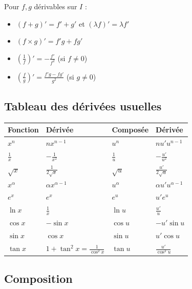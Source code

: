 \begin{propbox}
Pour $f, g$ dérivables sur $I$ :
\begin{itemize}[leftmargin=1cm]
  \item $(f + g)' = f' + g'$ \quad et \quad $(\lambda f)' = \lambda f'$
  \item $(f \times g)' = f'g + fg'$
  \item $\displaystyle\left(\frac{1}{f}\right)' = -\frac{f'}{f^2}$ \quad (si $f \neq 0$)
  \item $\displaystyle\left(\frac{f}{g}\right)' = \frac{f'g - fg'}{g^2}$ \quad (si $g \neq 0$)
\end{itemize}
\end{propbox}

\subsection{Tableau des dérivées usuelles}

\begin{center}
\renewcommand{\arraystretch}{1.5}
\begin{tabular}{|l|l||l|l|}
\hline
\textbf{Fonction} & \textbf{Dérivée} & \textbf{Composée} & \textbf{Dérivée} \\
\hline
$x^n$ & $nx^{n-1}$ & $u^n$ & $nu'u^{n-1}$ \\
$\frac{1}{x}$ & $-\frac{1}{x^2}$ & $\frac{1}{u}$ & $-\frac{u'}{u^2}$ \\
$\sqrt{x}$ & $\frac{1}{2\sqrt{x}}$ & $\sqrt{u}$ & $\frac{u'}{2\sqrt{u}}$ \\
$x^\alpha$ & $\alpha x^{\alpha-1}$ & $u^\alpha$ & $\alpha u' u^{\alpha-1}$ \\
$e^x$ & $e^x$ & $e^u$ & $u' e^u$ \\
$\ln x$ & $\frac{1}{x}$ & $\ln u$ & $\frac{u'}{u}$ \\
$\cos x$ & $-\sin x$ & $\cos u$ & $-u'\sin u$ \\
$\sin x$ & $\cos x$ & $\sin u$ & $u'\cos u$ \\
$\tan x$ & $1 + \tan^2 x = \frac{1}{\cos^2 x}$ & $\tan u$ & $\frac{u'}{\cos^2 u}$ \\
\hline
\end{tabular}
\end{center}

\subsection{Composition}


